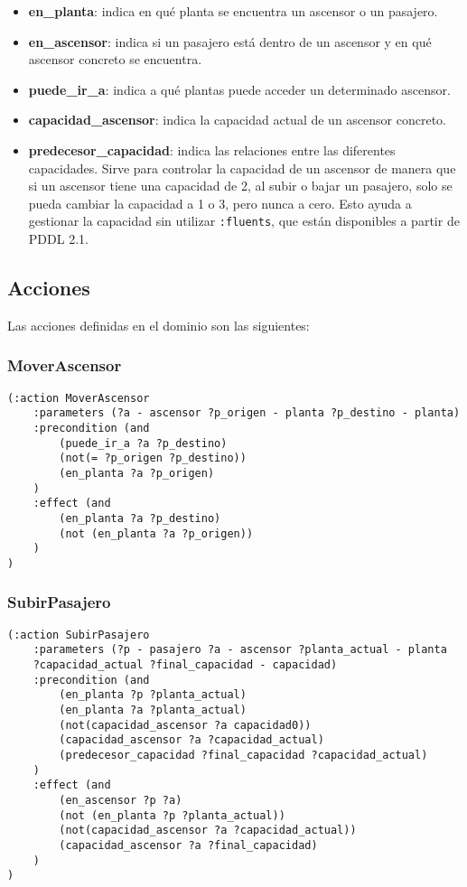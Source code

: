 \documentclass{article}
\begin{document}
\begin{itemize}
    \item \textbf{en\_planta}: indica en qué planta se encuentra un ascensor o un pasajero.
    \item \textbf{en\_ascensor}: indica si un pasajero está dentro de un ascensor y en qué ascensor concreto se encuentra.
    \item \textbf{puede\_ir\_a}: indica a qué plantas puede acceder un determinado ascensor.
    \item \textbf{capacidad\_ascensor}: indica la capacidad actual de un ascensor concreto.
    \item \textbf{predecesor\_capacidad}: indica las relaciones entre las diferentes capacidades. Sirve para controlar la capacidad de un ascensor de manera que si un ascensor tiene una capacidad de 2, al subir o bajar un pasajero, solo se pueda cambiar la capacidad a 1 o 3, pero nunca a cero. Esto ayuda a gestionar la capacidad sin utilizar
     \texttt{:fluents}, que están disponibles a partir de PDDL 2.1.
\end{itemize}


\subsection{Acciones}
Las acciones definidas en el dominio son las siguientes: 
\subsubsection{MoverAscensor}
\begin{verbatim}
(:action MoverAscensor
    :parameters (?a - ascensor ?p_origen - planta ?p_destino - planta)
    :precondition (and
        (puede_ir_a ?a ?p_destino)
        (not(= ?p_origen ?p_destino))
        (en_planta ?a ?p_origen)
    )
    :effect (and
        (en_planta ?a ?p_destino)
        (not (en_planta ?a ?p_origen))
    )
)
\end{verbatim}

\subsubsection{SubirPasajero}
\begin{verbatim}
(:action SubirPasajero
    :parameters (?p - pasajero ?a - ascensor ?planta_actual - planta 
    ?capacidad_actual ?final_capacidad - capacidad)
    :precondition (and
        (en_planta ?p ?planta_actual)
        (en_planta ?a ?planta_actual)
        (not(capacidad_ascensor ?a capacidad0))
        (capacidad_ascensor ?a ?capacidad_actual)
        (predecesor_capacidad ?final_capacidad ?capacidad_actual)
    )
    :effect (and
        (en_ascensor ?p ?a)
        (not (en_planta ?p ?planta_actual))
        (not(capacidad_ascensor ?a ?capacidad_actual))
        (capacidad_ascensor ?a ?final_capacidad)
    )
)
\end{verbatim}
\end{document}
